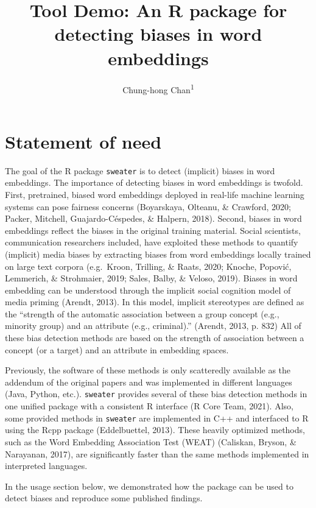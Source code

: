 \documentclass[english,man]{apa6}
\title{Tool Demo: An R package for detecting biases in word embeddings}
\author{Chung-hong Chan\textsuperscript{1}}
\date{}
\affiliation{\vspace{0.5cm}\textsuperscript{1} Mannheimer Zentrum für Europäische Sozialforschung}
\begin{document}
\maketitle

\hypertarget{statement-of-need}{%
\section{Statement of need}\label{statement-of-need}}

The goal of the R package \texttt{sweater} is to detect (implicit) biases in word embeddings. The importance of detecting biases in word embeddings is twofold. First, pretrained, biased word embeddings deployed in real-life machine learning systems can pose fairness concerns (Boyarskaya, Olteanu, \& Crawford, 2020; Packer, Mitchell, Guajardo-Céspedes, \& Halpern, 2018). Second, biases in word embeddings reflect the biases in the original training material. Social scientists, communication researchers included, have exploited these methods to quantify (implicit) media biases by extracting biases from word embeddings locally trained on large text corpora (e.g.~Kroon, Trilling, \& Raats, 2020; Knoche, Popović, Lemmerich, \& Strohmaier, 2019; Sales, Balby, \& Veloso, 2019). Biases in word embedding can be understood through the implicit social cognition model of media priming (Arendt, 2013). In this model, implicit stereotypes are defined as the \enquote{strength of the automatic association between a group concept (e.g., minority group) and an attribute (e.g., criminal).} (Arendt, 2013, p. 832) All of these bias detection methods are based on the strength of association between a concept (or a target) and an attribute in embedding spaces.

Previously, the software of these methods is only scatteredly available as the addendum of the original papers and was implemented in different languages (Java, Python, etc.). \texttt{sweater} provides several of these bias detection methods in one unified package with a consistent R interface (R Core Team, 2021). Also, some provided methods in \texttt{sweater} are implemented in C++ and interfaced to R using the Rcpp package (Eddelbuettel, 2013). These heavily optimized methods, such as the Word Embedding Association Test (WEAT) (Caliskan, Bryson, \& Narayanan, 2017), are significantly faster than the same methods implemented in interpreted languages.

In the usage section below, we demonstrated how the package can be used to detect biases and reproduce some published findings.
\end{document}
